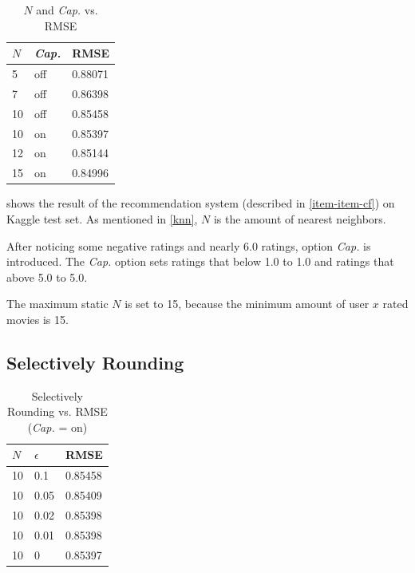 \documentclass{ece}
\begin{document}
\begin{table}[!htpb]
    \caption[$N$ and \textit{Cap.} vs. RMSE]{$N$ and \textit{Cap.} vs. RMSE}
    \label{tab:table-2}
    \centering
\begin{tabular}{|l|l|l|}
\hline
\textbf{$N$}  & \textbf{\textit{Cap.}} & \textbf{RMSE}    \\ \hline
5  & off  & 0.88071 \\ \hline
7  & off  & 0.86398 \\ \hline
10 & off  & 0.85458 \\ \hline
10 & on   & 0.85397 \\ \hline
12 & on   & 0.85144 \\ \hline
15 & on   & 0.84996 \\ \hline
\end{tabular}
\end{table}

 shows the result of the recommendation system (described in \ref{item-item-cf}) on Kaggle test set.
As mentioned in \ref{knn}, $N$ is the amount of nearest neighbors.

After noticing some negative ratings and nearly 6.0 ratings, option \textit{Cap.} is introduced.
The \textit{Cap.} option sets ratings that below 1.0 to 1.0 and ratings that above 5.0 to 5.0.

The maximum static $N$ is set to 15, because the minimum amount of user $x$ rated movies is 15.

\subsection{Selectively Rounding}

\begin{table}[h]
    \caption[Selectively Rounding vs. RMSE]{Selectively Rounding vs. RMSE (\textit{Cap.} = on)}
    \label{tab:table-3}
    \centering
\begin{tabular}{|l|l|l|}
\hline
\textbf{$N$}  & \textbf{$\epsilon$} & \textbf{RMSE}    \\ \hline
10 & 0.1     & 0.85458 \\ \hline
10 & 0.05    & 0.85409 \\ \hline
10 & 0.02    & 0.85398 \\ \hline
10 & 0.01    & 0.85398 \\ \hline
10 & 0       & 0.85397 \\ \hline
\end{tabular}
\end{table}
\end{document}
